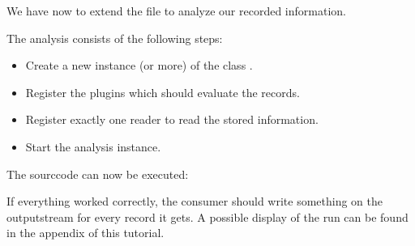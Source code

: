 		\setJavaCodeListing       
		

		We have now to extend the file  to analyze our recorded information.

		\setJavaCodeListing       
		

		\notify The analysis consists of the following steps:
		\begin{itemize}
			\item Create a new instance (or more) of the class .
			\item Register the plugins which should evaluate the records.
			\item Register exactly one reader to read the stored information.
			\item Start the analysis instance.
		\end{itemize}
		The sourccode can now be executed:

		\setBashListing 		
				

		If everything worked correctly, the consumer should write something on the outputstream for every record it gets. A possible display of the run can be found in the appendix of this tutorial. 